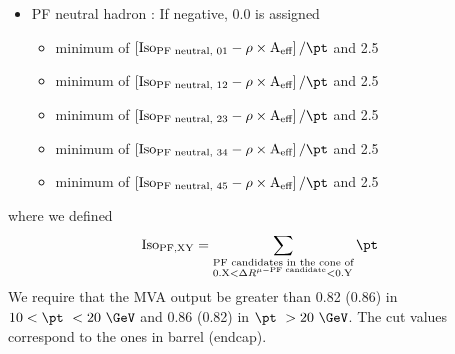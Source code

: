 \begin{itemize}
\item PF neutral hadron : If negative, 0.0 is assigned
	\begin{itemize}
    \item minimum of $\left[\textrm{Iso}_\textrm{PF neutral, 01} - \rho \times \textrm{A}_{\textrm{eff}}\right]/\pt$ and 2.5 
    \item minimum of $\left[\textrm{Iso}_\textrm{PF neutral, 12} - \rho \times \textrm{A}_{\textrm{eff}}\right]/\pt$ and 2.5 
    \item minimum of $\left[\textrm{Iso}_\textrm{PF neutral, 23} - \rho \times \textrm{A}_{\textrm{eff}}\right]/\pt$ and 2.5 
    \item minimum of $\left[\textrm{Iso}_\textrm{PF neutral, 34} - \rho \times \textrm{A}_{\textrm{eff}}\right]/\pt$ and 2.5 
    \item minimum of $\left[\textrm{Iso}_\textrm{PF neutral, 45} - \rho \times \textrm{A}_{\textrm{eff}}\right]/\pt$ and 2.5 
	\end{itemize}
\end{itemize}
where we defined 
\begin{eqnarray} 
\textrm{Iso}_\textrm{PF,XY} 
= 
\sum_{
\begin{subarray}{l}
\textrm{PF candidates in the cone of} \\
\textrm{0.X}   < \Delta R^{\mu-\textrm{PF candidate}} < \textrm{0.Y} 
    \end{subarray} }
\pt
\end{eqnarray} 
We require that the MVA output be greater than 0.82 (0.86) in $10<\pt~<20~\GeV$ 
and 0.86 (0.82) in $\pt~>20~\GeV$. The cut values correspond to the ones in barrel (endcap).

